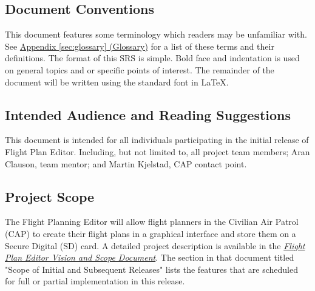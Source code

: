 \documentclass[12pt, letterpaper]{article}
\begin{document}
  \subsection{Document Conventions}
  This document features some terminology which readers may be unfamiliar with.
  See \hyperref[sec:glossary]{Appendix \ref{sec:glossary} (Glossary)} for a list of these terms and their definitions.
  The format of this SRS is simple. Bold face and indentation is used on general topics and or specific points of interest.
  The remainder of the document will be written using the standard font in \LaTeX.
  \subsection{Intended Audience and Reading Suggestions}
  This document is intended for all individuals participating in the initial release of Flight Plan Editor.
  Including, but not limited to, all project team members; Aran Clauson, team mentor; and Martin Kjelstad, CAP contact point.

  \subsection{Project Scope}
  The Flight Planning Editor will allow flight planners in the Civilian Air Patrol (CAP)
  to create their flight plans in a graphical interface and store them on a Secure Digital (SD) card.
  A detailed project description is available in the \hyperref[sec:ref]{\textit{Flight Plan Editor Vision and Scope Document}}.
  The section in that document titled "Scope of Initial and Subsequent Releases" lists the features that are
  scheduled for full or partial implementation in this release.
\end{document}
